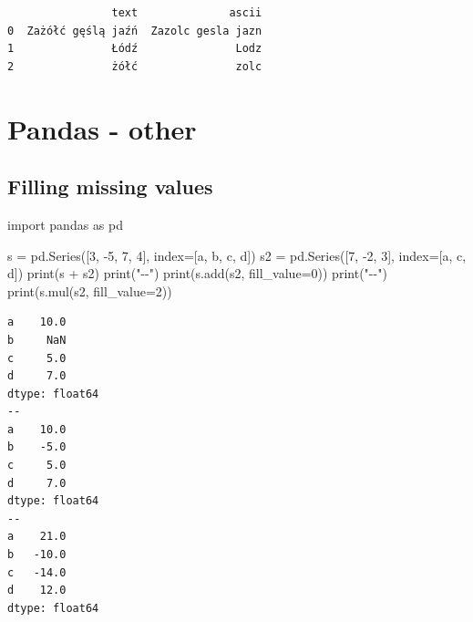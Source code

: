 \documentclass[
  english,
  letterpaper,
  DIV=11,
  numbers=noendperiod]{scrreprt}
\newenvironment{Shaded}{\begin{snugshade}}{\end{snugshade}}
\newcommand{\BuiltInTok}[1]{\textcolor[rgb]{0.00,0.23,0.31}{#1}}
\newcommand{\DecValTok}[1]{\textcolor[rgb]{0.68,0.00,0.00}{#1}}
\newcommand{\ImportTok}[1]{\textcolor[rgb]{0.00,0.46,0.62}{#1}}
\newcommand{\NormalTok}[1]{\textcolor[rgb]{0.00,0.23,0.31}{#1}}
\newcommand{\OperatorTok}[1]{\textcolor[rgb]{0.37,0.37,0.37}{#1}}
\newcommand{\StringTok}[1]{\textcolor[rgb]{0.13,0.47,0.30}{#1}}
\begin{document}
\begin{verbatim}
                text              ascii
0  Zażółć gęślą jaźń  Zazolc gesla jazn
1               Łódź               Lodz
2               żółć               zolc
\end{verbatim}

\chapter{Pandas - other}\label{pandas---other}

\section{Filling missing values}\label{filling-missing-values}

\begin{Shaded}
\begin{Highlighting}[]
\ImportTok{import}\NormalTok{ pandas }\ImportTok{as}\NormalTok{ pd}

\NormalTok{s }\OperatorTok{=}\NormalTok{ pd.Series([}\DecValTok{3}\NormalTok{, }\OperatorTok{{-}}\DecValTok{5}\NormalTok{, }\DecValTok{7}\NormalTok{, }\DecValTok{4}\NormalTok{], index}\OperatorTok{=}\NormalTok{[}\StringTok{\textquotesingle{}a\textquotesingle{}}\NormalTok{, }\StringTok{\textquotesingle{}b\textquotesingle{}}\NormalTok{, }\StringTok{\textquotesingle{}c\textquotesingle{}}\NormalTok{, }\StringTok{\textquotesingle{}d\textquotesingle{}}\NormalTok{])}
\NormalTok{s2 }\OperatorTok{=}\NormalTok{ pd.Series([}\DecValTok{7}\NormalTok{, }\OperatorTok{{-}}\DecValTok{2}\NormalTok{, }\DecValTok{3}\NormalTok{], index}\OperatorTok{=}\NormalTok{[}\StringTok{\textquotesingle{}a\textquotesingle{}}\NormalTok{, }\StringTok{\textquotesingle{}c\textquotesingle{}}\NormalTok{, }\StringTok{\textquotesingle{}d\textquotesingle{}}\NormalTok{])}
\BuiltInTok{print}\NormalTok{(s }\OperatorTok{+}\NormalTok{ s2)}
\BuiltInTok{print}\NormalTok{(}\StringTok{"{-}{-}"}\NormalTok{)}
\BuiltInTok{print}\NormalTok{(s.add(s2, fill\_value}\OperatorTok{=}\DecValTok{0}\NormalTok{))}
\BuiltInTok{print}\NormalTok{(}\StringTok{"{-}{-}"}\NormalTok{)}
\BuiltInTok{print}\NormalTok{(s.mul(s2, fill\_value}\OperatorTok{=}\DecValTok{2}\NormalTok{))}
\end{Highlighting}
\end{Shaded}

\begin{verbatim}
a    10.0
b     NaN
c     5.0
d     7.0
dtype: float64
--
a    10.0
b    -5.0
c     5.0
d     7.0
dtype: float64
--
a    21.0
b   -10.0
c   -14.0
d    12.0
dtype: float64
\end{verbatim}
\end{document}
